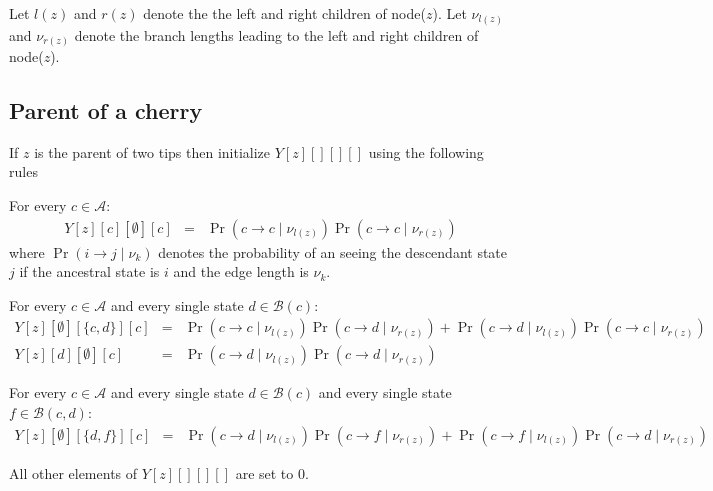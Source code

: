 \documentclass[11pt]{article}
\begin{document}
Let $l(z)$ and $r(z)$ denote the the left and right children of node($z$).
Let $\nu_{l(z)}$ and $\nu_{r(z)}$ denote the  branch lengths leading to the left and right children of node($z$).

\subsection{Parent of a cherry}
If $z$ is the parent of two tips then initialize $Y[z][][][]$ using the following rules

For every $c\in \mathcal{A}$:
\begin{eqnarray*}
Y[z][c][\emptyset][c] & = & \Pr(c\rightarrow c\mid \nu_{l(z)})\Pr(c\rightarrow c\mid \nu_{r(z)})
\end{eqnarray*}
where  $\Pr(i\rightarrow j\mid \nu_{k})$ denotes the probability of an 
	seeing the descendant state $j$ if the ancestral state is $i$ and 
	the edge length is $\nu_{k}$.


For every $c\in \mathcal{A}$ and every single state $d \in \mathcal{B}(c)$:
\begin{eqnarray*}
Y[z][\emptyset][\{c,d\}][c] & = & \Pr(c\rightarrow c\mid \nu_{l(z)})\Pr(c\rightarrow d\mid \nu_{r(z)}) + \Pr(c\rightarrow d\mid \nu_{l(z)})\Pr(c\rightarrow c\mid \nu_{r(z)}) \\
Y[z][d][\emptyset][c] & = & \Pr(c\rightarrow d\mid \nu_{l(z)})\Pr(c\rightarrow d\mid \nu_{r(z)})
\end{eqnarray*}

For every $c\in \mathcal{A}$ and every single state $d \in \mathcal{B}(c)$ and every single state $f\in\mathcal{B}(c,d)$:
\begin{eqnarray*}
Y[z][\emptyset][\{d,f\}][c] & = & \Pr(c\rightarrow d\mid \nu_{l(z)})\Pr(c\rightarrow f\mid \nu_{r(z)}) + \Pr(c\rightarrow f\mid \nu_{l(z)})\Pr(c\rightarrow d\mid \nu_{r(z)})
\end{eqnarray*}

All other elements of $Y[z][][][]$ are set to 0.


\end{document}
